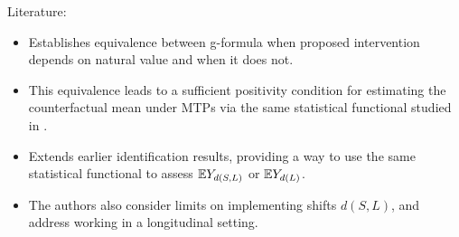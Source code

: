 \documentclass{beamer}
\begin{document}
\begin{frame}[c]{Literature: \cite{young2014identification}}

\begin{center}
\begin{itemize}
  \itemsep8pt
  \item Establishes equivalence between g-formula when proposed intervention
    depends on natural value and when it does not.
  \item This equivalence leads to a sufficient positivity condition for
    estimating the counterfactual mean under MTPs via the same statistical
    functional studied in \cite{diaz2012population}.
  \item Extends earlier identification results, providing a way to use the same
    statistical functional to assess $\mathbb{E} Y_{d(S,L)}$ or $\mathbb{E} Y_{d(L)}$.
  \item The authors also consider limits on implementing shifts $d(S,L)$, and
    address working in a longitudinal setting.
\end{itemize}
\end{center}

\note{
}

\end{frame}



\end{document}

